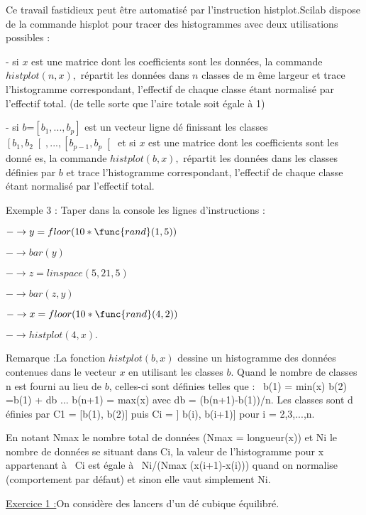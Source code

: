 \documentclass{article}
\begin{document}
Ce travail fastidieux peut \^{e}tre automatis\'{e} par l'instruction
histplot.Scilab dispose de la commande hisplot pour tracer des histogrammes
avec deux utilisations possibles :

- si $x$ est une matrice dont les coefficients sont les donn\'{e}es, la
commande $histplot(n,x),$ r\'{e}partit les donn\'{e}es dans $n$ classes de m%
\^{e}me largeur et trace l'histogramme correspondant, l'effectif de chaque
classe \'{e}tant normalis\'{e} par l'effectif total. (de telle sorte que
l'aire totale soit \'{e}gale \`{a} 1)

- si $b$=$\left[ b_{1},...,b_{p}\right] $ est un vecteur ligne d\'{e}%
finissant les classes $\left[ b_{1},b_{2}\right[ ,...,\left[ b_{p-1},b_{p}%
\right[ $ et si $x$ est une matrice dont les coefficients sont les donn\'{e}%
es, la commande $histplot(b,x),$ r\'{e}partit les donn\'{e}es dans les
classes d\'{e}finies par $b$ et trace l'histogramme correspondant,
l'effectif de chaque classe \'{e}tant normalis\'{e} par l'effectif total.

Exemple 3 : Taper dans la console les lignes d'instructions :

$-\rightarrow y=floor(10\ast \func{rand}(1,5))$

$-\rightarrow bar(y)$

$-\rightarrow z=linspace(5,21,5)$

$-\rightarrow bar(z,y)$

$-\rightarrow x=floor(10\ast \func{rand}(4,2))$

$-\rightarrow histplot(4,x).$

Remarque :La fonction $histplot(b,x)$ dessine un histogramme des donn\'{e}es
contenues dans le vecteur $x$ en utilisant les classes $b$. Quand le nombre
de classes n est fourni au lieu de $b$, celles-ci sont d\'{e}finies telles
que : \ b(1) = min(x) \TEXTsymbol{<} b(2) =b(1) + db \TEXTsymbol{<} ... 
\TEXTsymbol{<} b(n+1) = max(x) avec db = (b(n+1)-b(1))/n. Les classes sont d%
\'{e}finies par C1 = [b(1), b(2)] puis Ci = ] b(i), b(i+1)] pour i =
2,3,...,n.

En notant Nmax le nombre total de donn\'{e}es (Nmax = longueur(x)) et Ni le
nombre de donn\'{e}es se situant dans Ci, la valeur de l'histogramme pour x
appartenant \`{a}~ Ci est \'{e}gale \`{a}~ Ni/(Nmax (x(i+1)-x(i))) quand on
normalise (comportement par d\'{e}faut) et sinon elle vaut simplement Ni.

\underline{Exercice 1 :}On consid\`{e}re des lancers d'un d\'{e} cubique 
\'{e}quilibr\'{e}.
\end{document}

